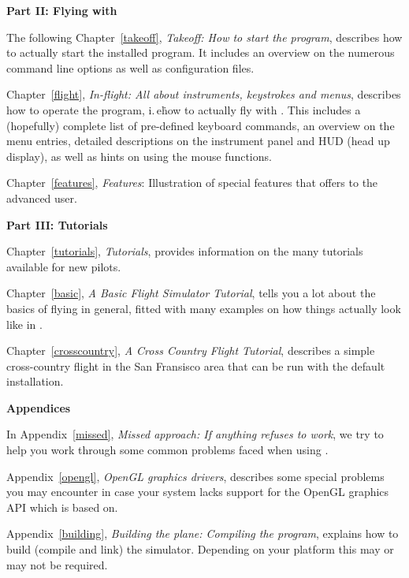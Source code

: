 \noindent
\textbf{Part II: Flying with \FlightGear{}}
\medskip

 \noindent
  The following Chapter~\ref{takeoff}, \textit{Takeoff: How to start
  the program}, describes how to actually start the installed program.
  It includes an overview on the numerous command line options as well
  as configuration files.
 \medskip

 \noindent
  Chapter~\ref{flight}, \textit{In-flight: All about instruments,
  keystrokes and menus}, describes how to operate the program, i.\,e\.
  how to actually fly with \FlightGear{}\hspace{-1mm}. This includes a
  (hopefully) complete list of pre-defined keyboard commands, an
  overview on the menu entries, detailed descriptions on the instrument
  panel and HUD (head up display), as well as hints on using the mouse
  functions.
 \medskip

 \noindent
  Chapter~\ref{features}, \textit{Features}: Illustration of special
  features that \FlightGear{} offers to the advanced user.
 \medskip

\noindent
\textbf{Part III: Tutorials}
\medskip

 \noindent
 Chapter~\ref{tutorials}, \textit{Tutorials},
provides information on the many tutorials available for new pilots.
 \medskip

 \noindent
 Chapter~\ref{basic}, \textit{A Basic Flight Simulator Tutorial},
tells you a lot about the basics of flying in general, fitted with many
examples on how things actually look like in \FlightGear{}.
 \medskip

 \noindent
 Chapter~\ref{crosscountry}, \textit{A Cross Country Flight Tutorial},
describes a simple cross-country flight in the San Fransisco area that
can be run with the default installation.
 \medskip

\noindent
\textbf{Appendices}
\medskip

 \noindent
  In Appendix~\ref{missed}, \textit{Missed approach: If anything refuses to work},
   we try to help you work through some common problems faced when using \FlightGear{}.
 \bigskip

 \noindent
Appendix~\ref{opengl}, \textit{OpenGL graphics drivers}, describes some
special problems you may encounter in case your system lacks support
for the OpenGL graphics API  which \FlightGear{} is based
on.
 \medskip

 \noindent
 Appendix~\ref{building}, \textit{Building the plane: Compiling the program},
explains how to build (compile and link) the simulator. Depending on your platform this
may or may not be required. 
 \medskip

